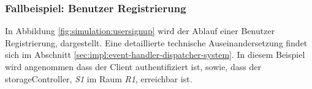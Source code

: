 \newpage
\subsubsection{Fallbeispiel: Benutzer Registrierung}
In Abbildung \ref{fig:simulation:usersignup} wird der Ablauf einer Benutzer Registrierung, dargestellt. Eine detaillierte technische Auseinandersetzung findet sich im Abschnitt \ref{sec:impl:event-handler-dispatcher-system}. In diesem Beispiel wird angenommen dass der Client authentifiziert ist, sowie, dass der \gls{storageController}, \textit{S1} im Raum \textit{R1}, erreichbar ist.
\vspace*{\fill}
\begin{center}
    \label{fig:simulation:usersignup}
\end{center}
\vspace*{\fill}

\newpage
